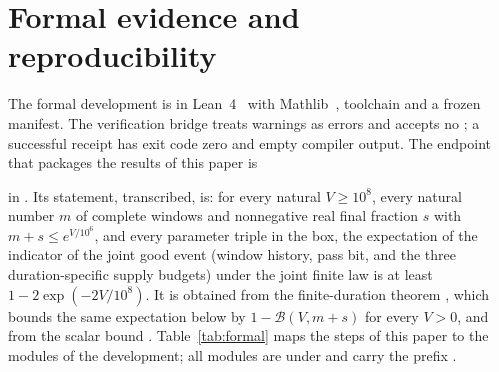 \documentclass[11pt,a4paper]{article}
\theoremstyle{plain}
\theoremstyle{definition}
\theoremstyle{remark}
\begin{document}
\section{Formal evidence and reproducibility}\label{app:formal}
The formal development is in Lean~4~\citep{demoura2021} with Mathlib~\citep{mathlib2020}, toolchain  and a frozen manifest. The verification bridge treats warnings as errors and accepts no ; a successful receipt has exit code zero and empty compiler output. The endpoint that packages the results of this paper is
\begin{center}
\end{center}
in . Its statement, transcribed, is: for every natural $V\ge10^8$, every natural number $m$ of complete windows and nonnegative real final fraction $s$ with $m+s\le e^{V/10^6}$, and every parameter triple in the box, the expectation of the indicator of the joint good event (window history, pass bit, and the three duration-specific supply budgets) under the joint finite law is at least $1-2\exp(-2V/10^8)$. It is obtained from the finite-duration theorem , which bounds the same expectation below by $1-\mathcal B(V,m+s)$ for every $V>0$, and from the scalar bound . Table~\ref{tab:formal} maps the steps of this paper to the modules of the development; all modules are under  and carry the prefix .
\end{document}
